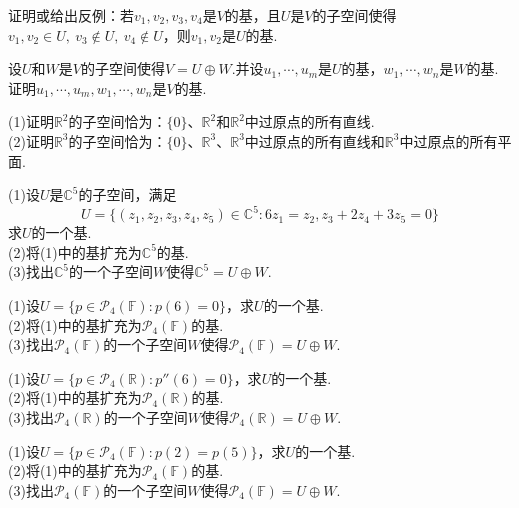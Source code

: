 \documentclass[lang=cn, zihao=5]{elegantbook}
\newcommand{\R}{\mathbb{R}}
\newcommand{\C}{\mathbb{C}}
\newcommand{\F}{\mathbb{F}}
\begin{document}
\begin{exercise}
	证明或给出反例：若$v_1,v_2,v_3,v_4$是$V$的基，且$U$是$V$的子空间使得$v_1,v_2 \in U,~ v_3 \notin U ,~ v_4 \notin U$，则$v_1,v_2$是$U$的基.
\end{exercise}

\begin{exercise}
	设$U$和$W$是$V$的子空间使得$V=U \oplus W$.并设$u_1, \cdots ,u_m$是$U$的基，$w_1, \cdots ,w_n$是$W$的基.证明$u_1, \cdots ,u_m,w_1, \cdots ,w_n$是$V$的基.
\end{exercise}

\begin{exercise}
	(1)证明$\R ^{2}$的子空间恰为：$\{ 0 \}$、$\R ^2$和$\R ^2$中过原点的所有直线. \\
    (2)证明$\R ^{3}$的子空间恰为：$\{ 0 \}$、$\R ^3$、$\R ^3$中过原点的所有直线和$\R ^3$中过原点的所有平面.
\end{exercise}

\begin{exercise}
	(1)设$U$是$\C ^{5}$的子空间，满足$$U= \{ (z_1,z_2,z_3,z_4,z_5) \in \C ^{5} : 6z_1=z_2,z_3+2z_4+3z_5=0 \}$$
	求$U$的一个基. \\
	(2)将(1)中的基扩充为$\C ^{5}$的基. \\
	(3)找出$\C ^{5}$的一个子空间$W$使得$\C ^{5} = U \oplus W$.
\end{exercise}

\begin{exercise}
	(1)设$U=\{ p \in \mathcal{P}_{4} (\F) : p(6)=0 \}$，求$U$的一个基. \\
	(2)将(1)中的基扩充为$\mathcal{P}_{4} (\F)$的基. \\
	(3)找出$\mathcal{P}_{4} (\F)$的一个子空间$W$使得$\mathcal{P}_{4} (\F) = U \oplus W$.
\end{exercise}

\begin{exercise}
	(1)设$U=\{ p \in \mathcal{P}_{4} (\R) : p''(6)=0 \}$，求$U$的一个基. \\
	(2)将(1)中的基扩充为$\mathcal{P}_{4} (\R)$的基. \\
	(3)找出$\mathcal{P}_{4} (\R)$的一个子空间$W$使得$\mathcal{P}_{4} (\R) = U \oplus W$.
\end{exercise}

\begin{exercise}
	(1)设$U=\{ p \in \mathcal{P}_{4} (\F) : p(2)=p(5) \}$，求$U$的一个基. \\
	(2)将(1)中的基扩充为$\mathcal{P}_{4} (\F)$的基. \\
	(3)找出$\mathcal{P}_{4} (\F)$的一个子空间$W$使得$\mathcal{P}_{4} (\F) = U \oplus W$.
\end{exercise}
\end{document}
